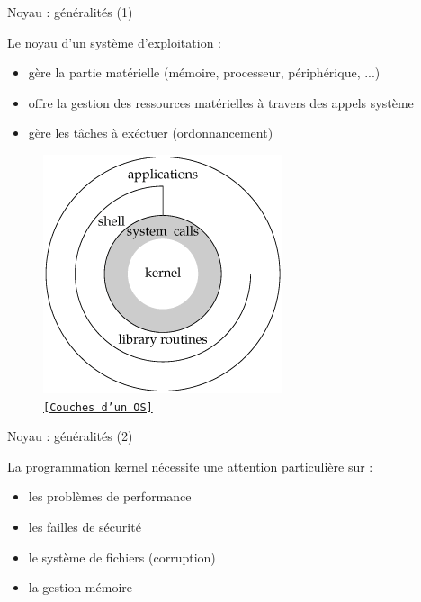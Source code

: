 \documentclass[12pt, t]{beamer}
\newcommand{\bi}{\begin{itemize}}
\newcommand{\ei}{\end{itemize}}
\newcommand{\src}[2]{\vspace{-10pt}\caption{\href{#1}{\centering \tt \tiny [#2]}}}
\begin{document}
\begin{frame}{Noyau : généralités (1)}

    \vspace{5pt}
    Le noyau d'un système d'exploitation :
    \vspace{3pt}
    \bi
    \itemsep4pt
    \item gère la partie matérielle (mémoire, processeur, périphérique, ...)
    \item offre la gestion des ressources matérielles à travers des appels
          système
    \item gère les tâches à exéctuer (ordonnancement)
    \ei

    {
        \begin{figure}
            \centering
            \includegraphics[scale=0.5]{kernel.png}
            \src{https://dimaslviv.wordpress.com/author/dimaslviv/}{Couches d'un OS}
        \end{figure}
    }

\end{frame}

\begin{frame}{Noyau : généralités (2)}

    \vspace{15pt}
    La programmation kernel nécessite une attention particulière sur :
    \vspace{8pt}
    \bi
    \itemsep12pt
    \item les problèmes de performance
    \item les failles de sécurité
    \item le système de fichiers (corruption)
    \item la gestion mémoire
    \ei

\end{frame}
\end{document}
